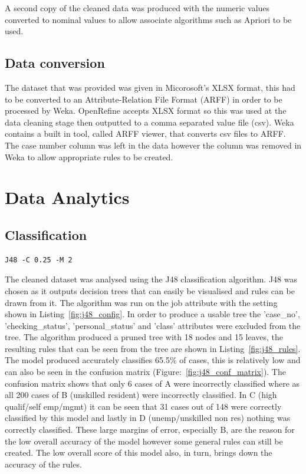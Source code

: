\documentclass[12pt]{article}
\begin{document}
A second copy of the cleaned data was produced with the numeric values converted to nominal values to allow associate algorithms such as Apriori to be used.

\subsection{Data conversion}
The dataset that was provided was given in Micorosoft's XLSX format, this had to be converted to an Attribute-Relation File Format (ARFF) in order to be processed by Weka. OpenRefine accepts XLSX format so this was used at the data cleaning stage then outputted to a comma separated value file (csv). Weka contains a built in tool, called ARFF viewer, that converts csv files to ARFF. The case number column was left in the data however the column was removed in Weka to allow appropriate rules to be created.
\section{Data Analytics}
\subsection{Classification}

\begin{lstlisting}[caption="J48 configuration"\label{fig:j48_config}]
J48 -C 0.25 -M 2
\end{lstlisting}

The cleaned dataset was analysed using the J48 classification algorithm. J48 was chosen as it outputs decision trees that can easily be visualised and rules can be drawn from it. The algorithm was run on the job attribute with the setting shown in Listing~\ref{fig:j48_config}. In order to produce a usable tree the 'case\_no', 'checking\_status', 'personal\_status' and 'class' attributes were excluded from the tree. The algorithm produced a pruned tree with 18 nodes and 15 leaves, the resulting rules that can be seen from the tree are shown in Listing~\ref{fig:j48_rules}. The model produced accurately classifies 65.5\% of cases, this is relatively low and can also be seen in the confusion matrix (Figure:~\ref{fig:j48_conf_matrix}). The confusion matrix shows that only 6 cases of A were incorrectly classified where as all 200 cases of B (unskilled resident) were incorrectly classified. In C (high qualif/self emp/mgmt) it can be seen that 31 cases out of 148 were correctly classified by this model and lastly in D (unemp/unskilled non res) nothing was correctly classified. These large margins of error, especially B, are the reason for the low overall accuracy of the model however some general rules can still be created. The low overall score of this model also, in turn, brings down the accuracy of the rules.
\end{document}
